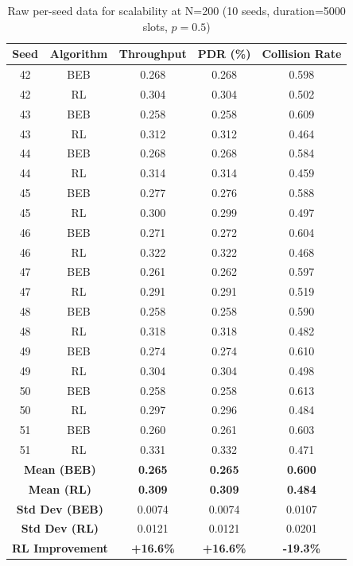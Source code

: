\documentclass[12pt,a4paper,oneside]{article}
\theoremstyle{definition}
\begin{document}
\begin{table}[H]
    \centering
    \small
    \begin{tabular}{|c|c|c|c|c|}
        \hline
        \textbf{Seed} & \textbf{Algorithm} & \textbf{Throughput} & \textbf{PDR (\%)} & \textbf{Collision Rate} \\
        \hline
        42 & BEB & 0.268 & 0.268 & 0.598 \\
        42 & RL & 0.304 & 0.304 & 0.502 \\
        \hline
        43 & BEB & 0.258 & 0.258 & 0.609 \\
        43 & RL & 0.312 & 0.312 & 0.464 \\
        \hline
        44 & BEB & 0.268 & 0.268 & 0.584 \\
        44 & RL & 0.314 & 0.314 & 0.459 \\
        \hline
        45 & BEB & 0.277 & 0.276 & 0.588 \\
        45 & RL & 0.300 & 0.299 & 0.497 \\
        \hline
        46 & BEB & 0.271 & 0.272 & 0.604 \\
        46 & RL & 0.322 & 0.322 & 0.468 \\
        \hline
        47 & BEB & 0.261 & 0.262 & 0.597 \\
        47 & RL & 0.291 & 0.291 & 0.519 \\
        \hline
        48 & BEB & 0.258 & 0.258 & 0.590 \\
        48 & RL & 0.318 & 0.318 & 0.482 \\
        \hline
        49 & BEB & 0.274 & 0.274 & 0.610 \\
        49 & RL & 0.304 & 0.304 & 0.498 \\
        \hline
        50 & BEB & 0.258 & 0.258 & 0.613 \\
        50 & RL & 0.297 & 0.296 & 0.484 \\
        \hline
        51 & BEB & 0.260 & 0.261 & 0.603 \\
        51 & RL & 0.331 & 0.332 & 0.471 \\
        \hline
        \hline
        \multicolumn{2}{|c|}{\textbf{Mean (BEB)}} & \textbf{0.265} & \textbf{0.265} & \textbf{0.600} \\
        \multicolumn{2}{|c|}{\textbf{Mean (RL)}} & \textbf{0.309} & \textbf{0.309} & \textbf{0.484} \\
        \hline
        \multicolumn{2}{|c|}{\textbf{Std Dev (BEB)}} & 0.0074 & 0.0074 & 0.0107 \\
        \multicolumn{2}{|c|}{\textbf{Std Dev (RL)}} & 0.0121 & 0.0121 & 0.0201 \\
        \hline
        \multicolumn{2}{|c|}{\textbf{RL Improvement}} & \textbf{+16.6\%} & \textbf{+16.6\%} & \textbf{-19.3\%} \\
        \hline
    \end{tabular}
    \caption{Raw per-seed data for scalability at N=200 (10 seeds, duration=5000 slots, $p=0.5$)}
    \label{tab:raw_scalability_200}
\end{table}
\end{document}
